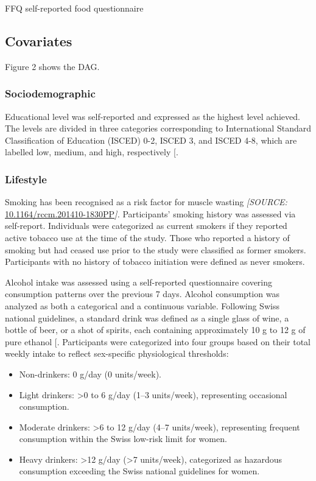 \documentclass[
  11pt,
]{article}
\providecommand{\tightlist}{%
  \setlength{\itemsep}{0pt}\setlength{\parskip}{0pt}}
\begin{document}
FFQ self-reported food questionnaire

\subsection{Covariates}\label{covariates}

Figure 2 shows the DAG.

\subsubsection{Sociodemographic}\label{sociodemographic}

Educational level was self-reported and expressed as the highest level
achieved. The levels are divided in three categories corresponding to
International Standard Classification of Education (ISCED) 0-2, ISCED 3,
and ISCED 4-8, which are labelled low, medium, and high, respectively
{[}\citeproc{ref-ISCED}{3}{]}.

\subsubsection{Lifestyle}\label{lifestyle}

Smoking has been recognised as a risk factor for muscle wasting
\emph{{[}SOURCE:}
\href{https://doi.org/10.1164/rccm.201410-1830PP}{10.1164/rccm.201410-1830PP}\emph{{]}.}
Participants' smoking history was assessed via self-report. Individuals
were categorized as current smokers if they reported active tobacco use
at the time of the study. Those who reported a history of smoking but
had ceased use prior to the study were classified as former smokers.
Participants with no history of tobacco initiation were defined as never
smokers.

Alcohol intake was assessed using a self-reported questionnaire covering
consumption patterns over the previous 7 days. Alcohol consumption was
analyzed as both a categorical and a continuous variable. Following
Swiss national guidelines, a standard drink was defined as a single
glass of wine, a bottle of beer, or a shot of spirits, each containing
approximately 10 g to 12 g of pure ethanol
{[}\citeproc{ref-standardglas}{4}{]}. Participants were categorized into
four groups based on their total weekly intake to reflect sex-specific
physiological thresholds:

\begin{itemize}
\tightlist
\item
  Non-drinkers: 0 g/day (0 units/week).
\item
  Light drinkers: \textgreater0 to 6 g/day (1--3 units/week),
  representing occasional consumption.
\item
  Moderate drinkers: \textgreater6 to 12 g/day (4--7 units/week),
  representing frequent consumption within the Swiss low-risk limit for
  women.
\item
  Heavy drinkers: \textgreater12 g/day (\textgreater7 units/week),
  categorized as hazardous consumption exceeding the Swiss national
  guidelines for women.
\end{itemize}
\end{document}
